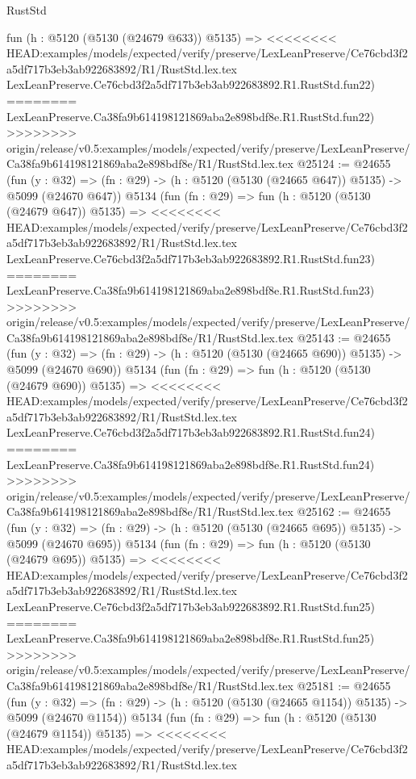 \begin{lexlean}{RustStd}
\begin{coremodule}
{\begin{coremodule}
{{{{{{{{{{{{{{{{{{{{{{{{{{{{{{{    fun (h : @5120 (@5130 (@24679 @633)) @5135) =>
<<<<<<<< HEAD:examples/models/expected/verify/preserve/LexLeanPreserve/Ce76cbd3f2a5df717b3eb3ab922683892/R1/RustStd.lex.tex
    LexLeanPreserve.Ce76cbd3f2a5df717b3eb3ab922683892.R1.RustStd.fun22)
========
    LexLeanPreserve.Ca38fa9b614198121869aba2e898bdf8e.R1.RustStd.fun22)
>>>>>>>> origin/release/v0.5:examples/models/expected/verify/preserve/LexLeanPreserve/Ca38fa9b614198121869aba2e898bdf8e/R1/RustStd.lex.tex
@25124 := @24655
    (fun (y : @32) => (fn : @29) -> (h : @5120 (@5130 (@24665 @647)) @5135) -> @5099 (@24670 @647))
    @5134
    (fun (fn : @29) =>
    fun (h : @5120 (@5130 (@24679 @647)) @5135) =>
<<<<<<<< HEAD:examples/models/expected/verify/preserve/LexLeanPreserve/Ce76cbd3f2a5df717b3eb3ab922683892/R1/RustStd.lex.tex
    LexLeanPreserve.Ce76cbd3f2a5df717b3eb3ab922683892.R1.RustStd.fun23)
========
    LexLeanPreserve.Ca38fa9b614198121869aba2e898bdf8e.R1.RustStd.fun23)
>>>>>>>> origin/release/v0.5:examples/models/expected/verify/preserve/LexLeanPreserve/Ca38fa9b614198121869aba2e898bdf8e/R1/RustStd.lex.tex
@25143 := @24655
    (fun (y : @32) => (fn : @29) -> (h : @5120 (@5130 (@24665 @690)) @5135) -> @5099 (@24670 @690))
    @5134
    (fun (fn : @29) =>
    fun (h : @5120 (@5130 (@24679 @690)) @5135) =>
<<<<<<<< HEAD:examples/models/expected/verify/preserve/LexLeanPreserve/Ce76cbd3f2a5df717b3eb3ab922683892/R1/RustStd.lex.tex
    LexLeanPreserve.Ce76cbd3f2a5df717b3eb3ab922683892.R1.RustStd.fun24)
========
    LexLeanPreserve.Ca38fa9b614198121869aba2e898bdf8e.R1.RustStd.fun24)
>>>>>>>> origin/release/v0.5:examples/models/expected/verify/preserve/LexLeanPreserve/Ca38fa9b614198121869aba2e898bdf8e/R1/RustStd.lex.tex
@25162 := @24655
    (fun (y : @32) => (fn : @29) -> (h : @5120 (@5130 (@24665 @695)) @5135) -> @5099 (@24670 @695))
    @5134
    (fun (fn : @29) =>
    fun (h : @5120 (@5130 (@24679 @695)) @5135) =>
<<<<<<<< HEAD:examples/models/expected/verify/preserve/LexLeanPreserve/Ce76cbd3f2a5df717b3eb3ab922683892/R1/RustStd.lex.tex
    LexLeanPreserve.Ce76cbd3f2a5df717b3eb3ab922683892.R1.RustStd.fun25)
========
    LexLeanPreserve.Ca38fa9b614198121869aba2e898bdf8e.R1.RustStd.fun25)
>>>>>>>> origin/release/v0.5:examples/models/expected/verify/preserve/LexLeanPreserve/Ca38fa9b614198121869aba2e898bdf8e/R1/RustStd.lex.tex
@25181 := @24655
    (fun (y : @32) =>
    (fn : @29) -> (h : @5120 (@5130 (@24665 @1154)) @5135) -> @5099 (@24670 @1154))
    @5134
    (fun (fn : @29) =>
    fun (h : @5120 (@5130 (@24679 @1154)) @5135) =>
<<<<<<<< HEAD:examples/models/expected/verify/preserve/LexLeanPreserve/Ce76cbd3f2a5df717b3eb3ab922683892/R1/RustStd.lex.tex
}}}}}}}}}}}}}}}}}}}}}}}}}}}}}}}
\end{coremodule}}
\end{coremodule}
\end{lexlean}
